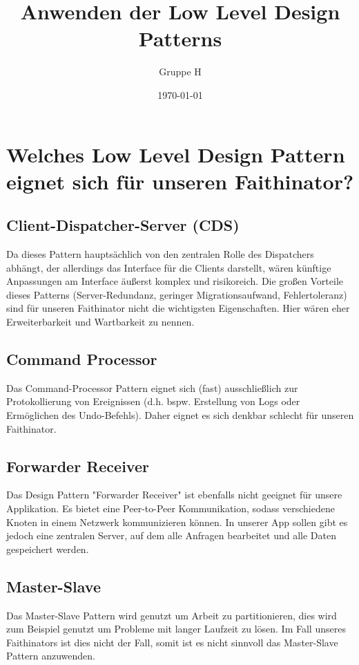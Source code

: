 \documentclass{scrreprt}
\title{Anwenden der Low Level Design Patterns}
\author{Gruppe H}
\date{\today}
\begin{document}
\maketitle
\tableofcontents

\part{Welches Low Level Design Pattern eignet sich für unseren Faithinator?}

\chapter{Client-Dispatcher-Server (CDS)}
Da dieses Pattern hauptsächlich von den zentralen Rolle des Dispatchers abhängt, der allerdings das Interface für die Clients darstellt, wären künftige Anpassungen am Interface äußerst komplex und risikoreich. Die großen Vorteile dieses Patterns (Server-Redundanz, geringer Migrationsaufwand, Fehlertoleranz) sind für unseren Faithinator nicht die wichtigsten Eigenschaften. Hier wären eher Erweiterbarkeit und Wartbarkeit zu nennen.

\chapter{Command Processor}
Das Command-Processor Pattern eignet sich (fast) ausschließlich zur Protokollierung von Ereignissen (d.h. bspw. Erstellung von Logs oder Ermöglichen des Undo-Befehls). Daher eignet es sich denkbar schlecht für unseren Faithinator.

\chapter{Forwarder Receiver}
Das Design Pattern "Forwarder Receiver" ist ebenfalls nicht geeignet für unsere Applikation. Es bietet eine Peer-to-Peer Kommunikation, sodass verschiedene Knoten in einem Netzwerk kommunizieren können. In unserer App sollen gibt es jedoch eine zentralen Server, auf dem alle Anfragen bearbeitet und alle Daten gespeichert werden.

\chapter{Master-Slave}
Das Master-Slave Pattern wird genutzt um Arbeit zu partitionieren, dies wird zum Beispiel genutzt um Probleme mit langer Laufzeit zu lösen. Im Fall unseres Faithinators ist dies nicht der Fall, somit ist es nicht sinnvoll das Master-Slave Pattern anzuwenden.
\end{document}
